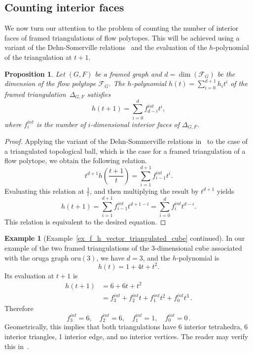 \documentclass[12pt, reqno]{amsart}
\theoremstyle{plain}
\newtheorem{proposition}[theorem]{Proposition}
\theoremstyle{definition}
\newtheorem{example}[theorem]{Example}
\numberwithin{equation}{section}
\newcommand\calF{\mathcal{F}}
\newcommand{\oru}[1]{\mathrm{oru}(#1)}
\begin{document}
\subsection{Counting interior faces} 
We now turn our attention to the problem of counting the number of interior faces of framed triangulations of flow polytopes. This will be achieved using a variant of the Dehn-Somerville relations~\cite{CeballosMuhle2022} and the evaluation of the $h$-polynomial of the triangulation at $t+1$.

 

\begin{proposition}
    Let $(G,F)$ be a framed graph and $d=\dim(\calF_G)$ be the dimension of the flow polytope $\calF_G$. The $h$-polynomial $h(t)= \sum_{i=0}^{d+1} h_i t^i$ of the framed triangulation~$\Delta_{G,F}$ satisfies
    \begin{equation}\label{eq_h_evaluation_interior_faces}
        h(t+1) =
        \sum_{i=0}^{d} f_{d-i}^{int} t^{i},
    \end{equation}
    where $f_i^{int}$ is the number of $i$-dimensional interior faces of $\Delta_{G,F}$.
\end{proposition}

\begin{proof}
    Applying the variant of the Dehn-Sommerville relations in~\cite[Corollary~3.2]{CeballosMuhle2022} to the case of a triangulated topological ball, which is the case for a framed triangulation of a flow polytope, we obtain the following relation.
    \begin{equation}
        t^{d+1}h\left( \frac{t+1}{t}\right) =
        \sum_{i=1}^{d+1} f_{i-1}^{int} t^i.
    \end{equation}
    Evaluating this relation at $\frac{1}{t}$, and then multiplying the result by $t^{d+1}$ yields
    \begin{equation}
        h(t+1) =
        \sum_{i=1}^{d+1} f_{i-1}^{int} t^{d+1-i}
        =
        \sum_{i=0}^{d} f_{i}^{int} t^{d-i}.
    \end{equation}
    This relation is equivalent to the desired equation.
\end{proof}

\begin{example}[Example~\ref{ex_f_h_vector_triangulated_cube} continued]
In our example of the two framed triangulations of the 3-dimensional cube associated with the oruga graph $\oru{3}$, we have $d = 3$, and the $h$-polynomial is
\[h(t)=1+4t+t^2.\]
Its evaluation at $t+1$ is
\begin{align*}
h(t+1) &= 6+6t+t^2\\
&= 
f_3^{int}+
f_2^{int}t+
f_1^{int}t^2+
f_0^{int}t^3 \,.
\end{align*}
Therefore
\[
f_3^{int}=6, \quad
f_2^{int}=6, \quad
f_1^{int}=1, \quad 
f_0^{int}=0 \, .
\]
Geometrically, this implies that both triangulations have 6 interior tetrahedra, 6 interior triangles, 1 interior edge, and no interior vertices. The reader may verify this in~.
\end{example}
\end{document}
